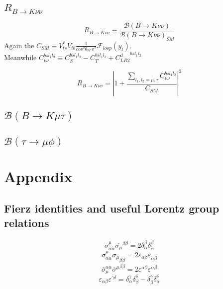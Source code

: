 \documentclass{article}
\begin{document}
\subsection{$R_{B\rightarrow K \nu \nu}$}
\[
R_{B\rightarrow K \nu \nu} \equiv \frac{\mathcal{B}(B\rightarrow K \nu \nu)}{\mathcal{B}(B\rightarrow K \nu \nu)_{SM}}
\]
Again the $C_{SM} \equiv V_{ts}^* V_{tb} \frac{1}{cos^2 \theta_W \ v^2} \mathcal{F}_{loop}(y_t)$.\\
Meanwhile $C_{\nu \nu}^{bs l_1 l_2} \equiv C_S^{bsl_1 l_2} - C_T^{bsl_1 l_2} + {C_{LR2}^d}^{bsl_1 l_2}$

\[
R_{B\rightarrow K \nu \nu} =  |1+ \frac{\sum_{l_1, l_2 = \mu , \tau} C_{\nu \nu}^{bsl_1 l_2}}{C_{SM}}|^2
\]

\subsection{$\mathcal{B}(B \rightarrow K \mu \tau)$}
\subsection{$\mathcal{B}(\tau \rightarrow \mu \phi)$}




\section{Appendix}
\subsection{Fierz identities and useful Lorentz group relations}
\[
\sigma_{\alpha \dot{\alpha}}^\mu \overline{\sigma_\mu}^{\beta \dot{\beta}}= 2\delta^\beta_\alpha \delta^{\dot{\beta}}_{\dot{\alpha}}
\]
\[
\sigma_{\alpha \dot{\alpha}}^\mu {\sigma_{\mu}}_{\beta \dot{\beta}}= 2 \varepsilon_{\alpha \beta} \varepsilon_{\dot{\alpha} \dot{\beta}} 
\]
\[
\overline{\sigma}_\mu^{\alpha \dot{\alpha}} {\overline{\sigma}^{\mu}}^{\beta \dot{\beta}}= 2 \varepsilon^{\alpha \beta} \varepsilon^{\dot{\alpha} \dot{\beta}} 
\]
\[
\varepsilon_{\alpha \beta} \varepsilon^{\gamma \delta} = \delta_\alpha^\gamma \delta_\beta^\delta - \delta_\beta^\gamma \delta_\alpha^\delta
\]
\end{document}
